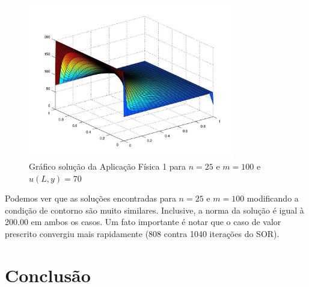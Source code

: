 \documentclass[
	11pt,				%
	oneside,			%
	a4paper,			%
	english,			%
	brazil,				%
	]{article}
\begin{document}
\begin{figure}[h]
    \centering
    \includegraphics[width=0.8\textwidth]{a170_25-100}
    \caption{Gráfico solução da Aplicação Física 1 para $n = 25$ e $m = 100$ e 
$u(L, y) = 70$}
    \label{fig:a170_25-100}
\end{figure}

Podemos ver que as soluções encontradas para $n = 25$ e $m = 100$ modificando a 
condição de contorno são muito similares. Inclusive, a norma da solução é igual 
à 200.00 em ambos os casos. Um fato importante é notar que o caso de valor 
prescrito convergiu mais rapidamente (808 contra 1040 iterações do SOR).

\section{Conclusão}
\lipsum[2]
\end{document}
